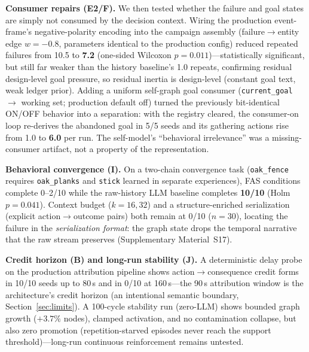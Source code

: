 \documentclass[10pt,a4paper]{article}
\begin{document}
\textbf{Consumer repairs (E2/F).} We then tested whether the failure
and goal states are simply not consumed by the decision context.
Wiring the production event-frame's negative-polarity encoding into
the campaign assembly (failure$\rightarrow$entity edge $w{=}{-}0.8$,
parameters identical to the production config) reduced repeated
failures from 10.5 to \textbf{7.2} (one-sided Wilcoxon
$p{=}0.011$)---statistically significant, but still far weaker than the history baseline's 1.0 repeats, confirming residual design-level goal pressure,
so residual inertia is design-level (constant goal text, weak ledger
prior). Adding a uniform self-graph goal consumer
(\texttt{current\_goal} $\rightarrow$ working set; production default
off) turned the previously bit-identical ON/OFF behavior into a
separation: with the registry cleared, the consumer-on loop re-derives
the abandoned goal in 5/5 seeds and its gathering actions rise from
1.0 to \textbf{6.0} per run. The self-model's ``behavioral
irrelevance'' was a missing-consumer artifact, not a property of the
representation.

\textbf{Behavioral convergence (I).} On a two-chain convergence task
(\texttt{oak\_fence} requires \texttt{oak\_planks} and \texttt{stick}
learned in separate experiences), FAS conditions complete 0--2/10
while the raw-history LLM baseline completes \textbf{10/10} (Holm
$p{=}0.041$). Context budget ($k{=}16,32$) and a structure-enriched
serialization (explicit action$\rightarrow$outcome pairs) both remain
at 0/10 ($n{=}30$), locating the failure in the \emph{serialization
format}: the graph state drops the temporal narrative that the raw
stream preserves (Supplementary Material~S17).

\textbf{Credit horizon (B) and long-run stability (J).} A deterministic
delay probe on the production attribution pipeline shows
action$\rightarrow$consequence credit forms in 10/10 seeds up to 80\,s
and in 0/10 at 160\,s---the 90\,s attribution window is the
architecture's credit horizon (an intentional semantic boundary,
Section~\ref{sec:limits}). A 100-cycle stability run (zero-LLM) shows
bounded graph growth ($+3.7\%$ nodes), clamped activation, and no
contamination collapse, but also zero promotion (repetition-starved
episodes never reach the support threshold)---long-run continuous reinforcement
remains untested.
\end{document}
